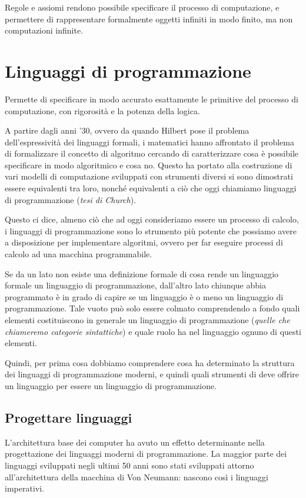 \documentclass[oneside,a4paper,11pt]{book}
\theoremstyle{italicstyle}
\theoremstyle{normStyle}
\begin{document}
\begin{tcolorbox}[title={Linguaggio Logico}]
  Regole e assiomi rendono possibile specificare il processo di computazione, e permettere di 
  rappresentare formalmente oggetti infiniti in modo finito, ma non 
  computazioni infinite.
\end{tcolorbox}
\section{Linguaggi di programmazione}
\begin{tcolorbox}[title={Linguaggio di programmazione}]
Permette di specificare in modo accurato esattamente le primitive 
del processo di computazione, con rigorosità e la potenza della logica.
\end{tcolorbox}
A partire dagli anni '30, ovvero da quando Hilbert pose il problema 
dell'espressività dei linguaggi formali, i matematici hanno affrontato 
il problema di formalizzare il concetto di algoritmo cercando di 
caratterizzare cosa è possibile specificare in modo algoritmico e 
cosa no. Questo ha portato alla costruzione di vari modelli di computazione 
sviluppati con strumenti diversi si sono dimostrati essere equivalenti 
tra loro, nonché equivalenti a ciò che oggi chiamiamo linguaggi di 
programmazione (\textit{tesi di Church}).

Questo ci dice, almeno ciò che ad oggi consideriamo essere un processo 
di calcolo, i linguaggi di programmazione sono lo strumento più potente 
che possiamo avere a disposizione per implementare algoritmi, ovvero 
per far eseguire processi di calcolo ad una macchina programmabile.

Se da un lato non esiste una definizione formale di cosa rende un linguaggio 
formale un linguaggio di programmazione, dall'altro lato chiunque abbia 
programmato è in grado di capire se un linguaggio è o meno un linguaggio 
di programmazione. Tale vuoto può solo essere colmato comprendendo a 
fondo quali elementi costituiscono in generale un linguaggio di programmazione 
(\textit{quelle che chiameremo categorie sintattiche}) e quale ruolo 
ha nel linguaggio ognuno di questi elementi.

Quindi, per prima cosa dobbiamo comprendere cosa ha determinato la struttura 
dei linguaggi di programmazione moderni, e quindi quali strumenti 
di deve offrire un linguaggio per essere un linguaggio di programmazione.
\subsection{Progettare linguaggi}
L'architettura base dei computer ha avuto un effetto determinante nella 
progettazione dei linguaggi moderni di programmazione. La maggior parte 
dei linguaggi sviluppati negli ultimi 50 anni sono stati sviluppati attorno 
all'architettura della macchina di Von Neumann: nascono così i linguaggi imperativi.
\end{document}

